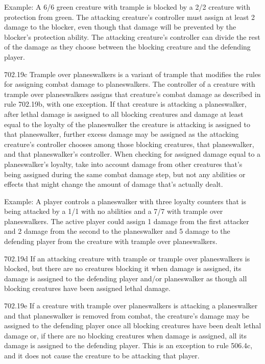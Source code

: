 Example: A 6/6 green creature with trample is blocked by a 2/2 creature with protection from green. The attacking creature’s controller must assign at least 2 damage to the blocker, even though that damage will be prevented by the blocker’s protection ability. The attacking creature’s controller can divide the rest of the damage as they choose between the blocking creature and the defending player.

702.19c Trample over planeswalkers is a variant of trample that modifies the rules for assigning combat damage to planeswalkers. The controller of a creature with trample over planeswalkers assigns that creature’s combat damage as described in rule 702.19b, with one exception. If that creature is attacking a planeswalker, after lethal damage is assigned to all blocking creatures and damage at least equal to the loyalty of the planeswalker the creature is attacking is assigned to that planeswalker, further excess damage may be assigned as the attacking creature’s controller chooses among those blocking creatures, that planeswalker, and that planeswalker’s controller. When checking for assigned damage equal to a planeswalker’s loyalty, take into account damage from other creatures that’s being assigned during the same combat damage step, but not any abilities or effects that might change the amount of damage that’s actually dealt.

Example: A player controls a planeswalker with three loyalty counters that is being attacked by a 1/1 with no abilities and a 7/7 with trample over planeswalkers. The active player could assign 1 damage from the first attacker and 2 damage from the second to the planeswalker and 5 damage to the defending player from the creature with trample over planeswalkers.

702.19d If an attacking creature with trample or trample over planeswalkers is blocked, but there are no creatures blocking it when damage is assigned, its damage is assigned to the defending player and/or planeswalker as though all blocking creatures have been assigned lethal damage.

702.19e If a creature with trample over planeswalkers is attacking a planeswalker and that planeswalker is removed from combat, the creature’s damage may be assigned to the defending player once all blocking creatures have been dealt lethal damage or, if there are no blocking creatures when damage is assigned, all its damage is assigned to the defending player. This is an exception to rule 506.4c, and it does not cause the creature to be attacking that player.

